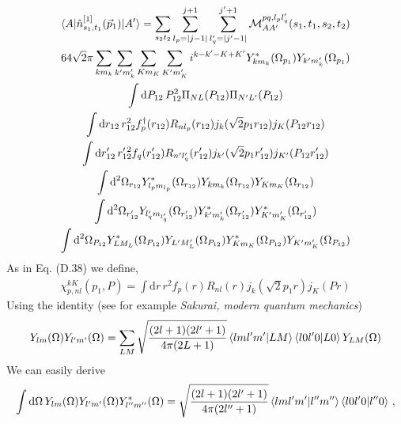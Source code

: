\documentclass[10pt]{article}
\begin{document}
\begin{multline*}
\braket{ A | \hat{n}^{[1]}_{s_1,t_1}(\vec{p}_1) | A'} = \sum_{s_2 t_2}  \sum_{l_p = |j-1|}^{j+1} \sum_{l_q' = |j' - 1|}^{j'+1} \mathcal{M}_{AA'}^{p q,l_p l_q'}(s_1,t_1,s_2,t_2) \\
64 \sqrt{2} \pi \sum_{k m_k} \sum_{k' m_k'} \sum_{K m_K} \sum_{K' m_K'} i^{k-k'-K+K'} Y_{k m_k}^{*}(\Omega_{p_1}) Y_{k' m_k'}(\Omega_{p_1}) \\
 \int \text{d} P_{12} \, P_{12}^{2} \Pi_{N L}(P_{12}) \Pi_{N' L'}(P_{12})\\
 \int \text{d} r_{12}\, r_{12}^{2} f_{p}^{\dagger}(r_{12}) R_{n l_p}(r_{12}) j_{k}( \sqrt{2} p_1 r_{12})  j_{K}(P_{12} r_{12}) \\
\int \text{d} r_{12}' \, r_{12}^{\prime \, 2} f_{q}(r_{12}')  R_{n' l_q'}(r_{12}') j_{k'}( \sqrt{2} p_1 r_{12}')  j_{K'}(P_{12} r_{12}') \\
 \int \text{d}^{2} \Omega_{r_{12}}  Y_{l_p m_{l_p} }^{*}(\Omega_{r_{12}}) Y_{k m_k}(\Omega_{r_{12}}) Y_{K m_K}(\Omega_{r_{12}}) \\
 \int \text{d}^{2} \Omega_{r_{12}'}  Y_{ l_q' m_{l_q'} }(\Omega_{r_{12}'})  Y_{k' m_k'}^{*}(\Omega_{r_{12}'}) Y_{K' m_K'}^{*}(\Omega_{r_{12}'}) \\
   \int \text{d}^{2} \Omega_{P_{12}}  Y_{L M_L}^{*}(\Omega_{P_{12}})  Y_{L' M_L'}(\Omega_{P_{12}}) Y_{K m_K}^{*}(\Omega_{P_{12}}) Y_{K' m_K'}(\Omega_{P_{12}})
\end{multline*}
As in Eq. (D.38) we define,
\begin{align*}
	\chi_{p,nl}^{kK}(p_1,P) = \int \text{d} r\, r^{2} f_{p}(r) R_{n l}(r) j_{k}( \sqrt{2} p_1 r)  j_{K}(P r)
\end{align*}
Using the identity (see for example \textit{Sakurai, modern quantum mechanics})
\begin{align*}
	Y_{ l m }(\Omega) Y_{ l' m'}(\Omega) = \sum_{LM} \sqrt{ \frac{(2l+1)(2l'+1)}{4 \pi (2L+1)}} \braket{ l m l' m' | L M} \braket{ l 0 l' 0 | L 0 } Y_{L M}(\Omega)
\end{align*}
We can easily derive
\begin{align*}
	\int \text{d} \Omega \, Y_{ l m }(\Omega) Y_{ l' m'}(\Omega) Y_{ l'' m''}^{*}(\Omega) = \sqrt{ \frac{(2l+1)(2l'+1)}{4 \pi (2l''+1)}} \braket{ l m l' m' | l'' m''} \braket{ l 0 l' 0 | l'' 0 } \, ,
\end{align*}
\end{document}
